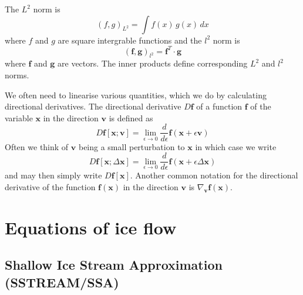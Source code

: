 \documentclass[10pt,a4paper]{book}
\begin{document}
The $L^2$ norm is 
\[
 (f,g)_{L^2} = \int f(x) \, g(x) \, dx
 \]
 where $f$ and $g$ are square intergrable functions and the $l^2$ norm
 is
\[
(\bm{f}, \bm{g} )_{l^2} = \bm{f}^T \cdot \bm{g}
\]
where $\bm{f}$ and $\bm{g}$ are vectors. The inner products define
corresponding $L^2$ and $l^2$ norms.

We often need to linearise various quantities, which we do by
calculating directional derivatives. The directional derivative $D \bm{f}$ of a
function $\bm{f}$ of the variable $\bm{x}$ in the direction $\bm{v}$ is defined as
\[
  D \bm{f}[\bm{x} ; \bm{v}] = \lim_{\epsilon \to 0} \frac{d}{d \epsilon} \bm{f}(\bm{x}+\epsilon \bm{v})
\]
Often we think of $\bm{v}$ being a small perturbation to $\bm{x}$ in which case we write
\[
  D \bm{f}[\bm{x} ; \Delta \bm{x}] = \lim_{\epsilon \to 0} \frac{d}{d \epsilon} \bm{f}(\bm{x}+\epsilon \Delta \bm{x})
\]
and may then simply write $D \bm{f}[\bm{x}]$.  Another common notation for the
directional derivative of the function $\bm{f}(\bm{x})$ in the
direction $\bm{v}$ is $\nabla_{\bm{v}} \bm{f}(\bm{x})$.
  






\mainmatter
\chapter{Equations of ice flow}



\section{Shallow Ice Stream Approximation (SSTREAM/SSA)}
\end{document}
